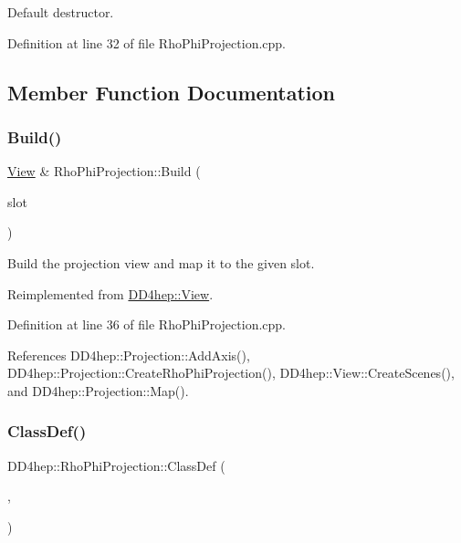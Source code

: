 Default destructor. 



Definition at line 32 of file Rho\+Phi\+Projection.\+cpp.



\subsection{Member Function Documentation}
\hypertarget{class_d_d4hep_1_1_rho_phi_projection_a6a8d8e5c6a15d559da719c23eb8d7b8c}{}\label{class_d_d4hep_1_1_rho_phi_projection_a6a8d8e5c6a15d559da719c23eb8d7b8c} 
\subsubsection{\texorpdfstring{Build()}{Build()}}
{\footnotesize\ttfamily \hyperlink{class_d_d4hep_1_1_view}{View} \& Rho\+Phi\+Projection\+::\+Build (\begin{DoxyParamCaption}\item[{T\+Eve\+Window $\ast$}]{slot }\end{DoxyParamCaption})\hspace{0.3cm}{\ttfamily [virtual]}}



Build the projection view and map it to the given slot. 



Reimplemented from \hyperlink{class_d_d4hep_1_1_view_ab4e12874a9cb6a599f268b027443c6ce}{D\+D4hep\+::\+View}.



Definition at line 36 of file Rho\+Phi\+Projection.\+cpp.



References D\+D4hep\+::\+Projection\+::\+Add\+Axis(), D\+D4hep\+::\+Projection\+::\+Create\+Rho\+Phi\+Projection(), D\+D4hep\+::\+View\+::\+Create\+Scenes(), and D\+D4hep\+::\+Projection\+::\+Map().

\hypertarget{class_d_d4hep_1_1_rho_phi_projection_a33fb99400480c317f4e4d9fabf48836c}{}\label{class_d_d4hep_1_1_rho_phi_projection_a33fb99400480c317f4e4d9fabf48836c} 
\subsubsection{\texorpdfstring{Class\+Def()}{ClassDef()}}
{\footnotesize\ttfamily D\+D4hep\+::\+Rho\+Phi\+Projection\+::\+Class\+Def (\begin{DoxyParamCaption}\item[{\hyperlink{class_d_d4hep_1_1_rho_phi_projection}{Rho\+Phi\+Projection}}]{,  }\item[{0}]{ }\end{DoxyParamCaption})}



